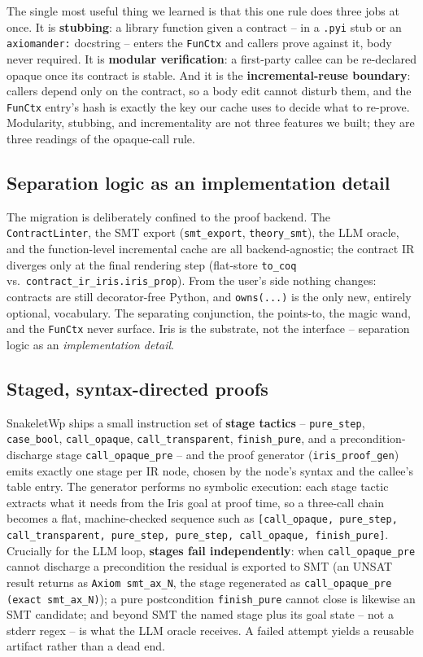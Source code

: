 \documentclass[sigconf,nonacm]{acmart}
\newcommand{\code}[1]{\texttt{#1}}
\begin{document}
The single most useful thing we learned is that this one rule does three jobs at
once. It is \textbf{stubbing}: a library function given a contract -- in a
\code{.pyi} stub or an \code{axiomander:} docstring -- enters the \code{FunCtx}
and callers prove against it, body never required. It is \textbf{modular
verification}: a first-party callee can be re-declared opaque once its contract
is stable. And it is the \textbf{incremental-reuse boundary}: callers depend only
on the contract, so a body edit cannot disturb them, and the \code{FunCtx}
entry's hash is exactly the key our cache uses to decide what to re-prove.
Modularity, stubbing, and incrementality are not three features we built; they
are three readings of the opaque-call rule.

\subsection{Separation logic as an implementation detail}

The migration is deliberately confined to the proof backend. The
\code{ContractLinter}, the SMT export (\code{smt\_export}, \code{theory\_smt}),
the LLM oracle, and the function-level incremental cache are all
backend-agnostic; the contract IR diverges only at the final rendering step
(flat-store \code{to\_coq} vs.\ \code{contract\_ir\_iris.iris\_prop}). From the
user's side nothing changes: contracts are still decorator-free Python, and
\code{owns(...)} is the only new, entirely optional, vocabulary. The separating
conjunction, the points-to, the magic wand, and the \code{FunCtx} never surface.
Iris is the substrate, not the interface -- separation logic as an
\emph{implementation detail}.

\subsection{Staged, syntax-directed proofs}
\label{sec:staged}

SnakeletWp ships a small instruction set of \textbf{stage tactics} --
\code{pure\_step}, \code{case\_bool}, \code{call\_opaque},
\code{call\_transparent}, \code{finish\_pure}, and a precondition-discharge stage
\code{call\_opaque\_pre} -- and the proof generator (\code{iris\_proof\_gen})
emits exactly one stage per IR node, chosen by the node's syntax and the callee's
table entry. The generator performs no symbolic execution: each stage tactic
extracts what it needs from the Iris goal at proof time, so a three-call chain
becomes a flat, machine-checked sequence such as
\code{[call\_opaque, pure\_step, call\_transparent, pure\_step, pure\_step,
call\_opaque, finish\_pure]}. Crucially for the LLM loop, \textbf{stages fail
independently}: when \code{call\_opaque\_pre} cannot discharge a precondition the
residual is exported to SMT (an UNSAT result returns as \code{Axiom smt\_ax\_N},
the stage regenerated as \code{call\_opaque\_pre (exact smt\_ax\_N)}); a pure
postcondition \code{finish\_pure} cannot close is likewise an SMT candidate; and
beyond SMT the named stage plus its goal state -- not a stderr regex -- is what
the LLM oracle receives. A failed attempt yields a reusable artifact rather than
a dead end.
\end{document}
